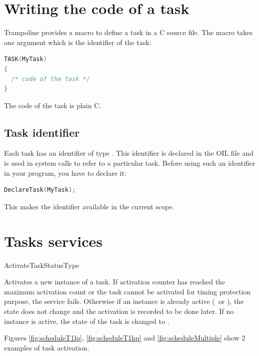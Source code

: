 \section{Writing the code of a task}

Trampoline provides a  macro to define a task in a C source file. The macro takes one argument which is the identifier of the task:

\begin{lstlisting}[language=C]
TASK(MyTask)
{
  /* code of the task */
}
\end{lstlisting}

The code of the task is plain C.

\subsection{Task identifier}

Each task has an identifier of type . This identifier is declared in the OIL file and is used in system calls to refer to a particular task. Before using such an identifier in your program, you have to declare it:

\begin{lstlisting}[language=C]
DeclareTask(MyTask);
\end{lstlisting}

This makes the  identifier available in the current scope.



\section{Tasks services}

\begin{service}{ActivateTask}{StatusType}


Activates a new instance of a task. If activation counter has reached the maximum activation count or the task cannot be activated for timing protection purpose, the service fails. Otherwise if an instance is already active (\RUNNING\ or \READY), the state does not change and the activation is recorded to be done later. If no instance is active, the state of the task is changed to \READY.

Figures \ref{fig:scheduleT1lp}, \ref{fig:scheduleT1hp} and \ref{fig:scheduleMultiple} show 2 examples of task activation.

\end{service}

